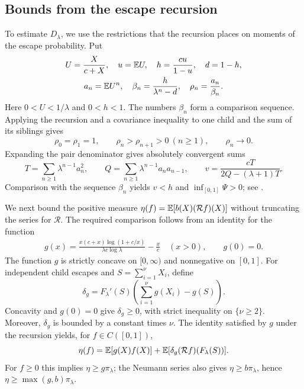 \subsection{Bounds from the escape recursion}
To estimate $D_\lambda$, we use the restrictions that the recursion places on moments of the escape probability. Put
\[
 \begin{gathered}
 U=\frac{X}{c+X},\quad u=\mathbb E U,\quad h=\frac{cu}{1-u},\quad d=1-h,\\
 a_n=\mathbb E U^n,\quad
 \beta_n=\frac{h}{\lambda^n-d},\quad \rho_n=\frac{a_n}{\beta_n}.
 \end{gathered}
\]
Here $0<U<1/\lambda$ and $0<h<1$. The numbers $\beta_n$ form a comparison sequence. Applying the recursion and a covariance inequality to one child and the sum of its siblings gives
\begin{equation}\label{eq:hex-moments}
 \rho_0=\rho_1=1,\qquad
 \rho_n>\rho_{n+1}>0\ (n\ge1),\qquad \rho_n\longrightarrow0.
\end{equation}
Expanding the pair denominator gives absolutely convergent sums
\[
 T=\sum_{n\ge1}\lambda^{n-1}a_n^2,\qquad
 Q=\sum_{n\ge1}\lambda^{n-1}a_na_{n-1},\qquad
 v=\frac{cT}{2Q-(\lambda+1)T}.
\]
Comparison with the sequence $\beta_n$ yields $v<h$ and
$\inf_{[0,1]}\Psi>0$; see \cite[Lemmas~6.2--6.3]{FullVersion}.

We next bound the positive measure $\eta(f)=\mathbb E[b(X)(\mathcal Rf)(X)]$ without truncating the series for $\mathcal R$. The required comparison follows from an identity for the function
\[
 \begin{gathered}
 g(x)=\frac{x(c+x)\log(1+c/x)}{\lambda c\log\lambda}-\frac{x}{c}
 \quad(x>0),\qquad g(0)=0.
 \end{gathered}
\]
The function $g$ is strictly concave on $[0,\infty)$ and nonnegative on $[0,1]$. For independent child escapes and $S=\sum_{i=1}^{\nu}X_i$, define
\[
 \delta_g=F_\lambda'(S)\left(\sum_{i=1}^{\nu}g(X_i)-g(S)\right).
\]
Concavity and $g(0)=0$ give $\delta_g\ge0$, with strict inequality on $\{\nu\ge2\}$. Moreover, $\delta_g$ is bounded by a constant times $\nu$. The identity satisfied by $g$ under the recursion yields, for $f\in C([0,1])$,
\begin{equation}\label{eq:hex-entropy}
 \eta(f)=\mathbb E[g(X)f(X)]
 +\mathbb E[\delta_g(\mathcal Rf)(F_\lambda(S))].
\end{equation}
For $f\ge0$ this implies $\eta\ge g\pi_\lambda$; the Neumann series
also gives $\eta\ge b\pi_\lambda$, hence
$\eta\ge\max(g,b)\pi_\lambda$.

